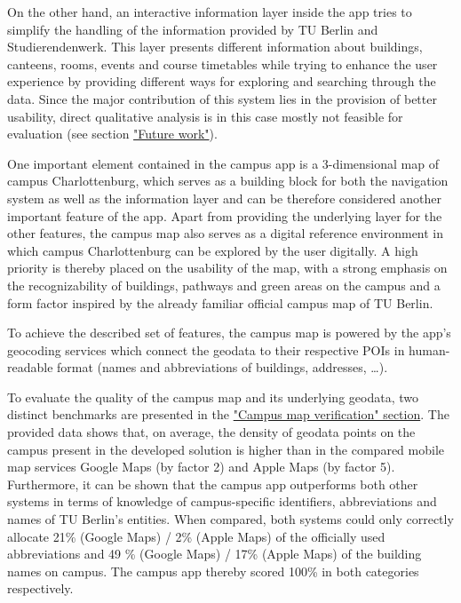 
On the other hand, an interactive information layer inside the app tries to simplify the handling of the information provided by TU Berlin and Studierendenwerk. This layer presents different information about buildings, canteens, rooms, events and course timetables while trying to enhance the user experience by providing different ways for exploring and searching through the data. Since the major contribution of this system lies in the provision of better usability, direct qualitative analysis is in this case mostly not feasible for evaluation (see section \hyperref[sec:future_work]{"Future work"}).


One important element contained in the campus app is a 3-dimensional map of campus Charlottenburg, which serves as a building block for both the navigation system as well as the information layer and can be therefore considered another important feature of the app. Apart from providing the underlying layer for the other features, the campus map also serves as a digital reference environment in which campus Charlottenburg can be explored by the user digitally. A high priority is thereby placed on the usability of the map, with a strong emphasis on the recognizability of buildings, pathways and green areas on the campus and a form factor inspired by the already familiar official campus map of TU Berlin.

To achieve the described set of features, the campus map is powered by the app's geocoding services which connect the geodata to their respective POIs in human-readable format (names and abbreviations of buildings, addresses, \ldots).

To evaluate the quality of the campus map and its underlying geodata, two distinct benchmarks are presented in the \hyperref[sec:campus_map_verification]{"Campus map verification" section}. The provided data shows that, on average, the density of geodata points on the campus present in the developed solution is higher than in the compared mobile map services Google Maps (by factor 2) and Apple Maps (by factor 5). Furthermore, it can be shown that the campus app outperforms both other systems in terms of knowledge of campus-specific identifiers, abbreviations and names of TU Berlin's entities. When compared, both systems could only correctly allocate 21\% (Google Maps) / 2\% (Apple Maps) of the officially used abbreviations and 49 \% (Google Maps) / 17\% (Apple Maps) of the building names on campus. The campus app thereby scored 100\% in both categories respectively.

